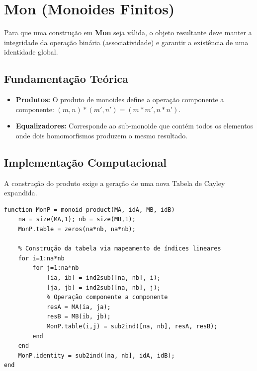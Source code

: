 \section{Mon (Monoides Finitos)}

Para que uma construção em \textbf{Mon} seja válida, o objeto resultante deve manter a integridade da operação binária (associatividade) e garantir a existência de uma identidade global.

\subsection{Fundamentação Teórica}
\begin{itemize}
    \item \textbf{Produtos:} O produto de monoides define a operação componente a componente: $(m,n) * (m',n') = (m * m', n * n')$.
    \item \textbf{Equalizadores:} Corresponde ao sub-monoide que contém todos os elementos onde dois homomorfismos produzem o mesmo resultado.
\end{itemize}

\subsection{Implementação Computacional}
A construção do produto exige a geração de uma nova Tabela de Cayley expandida.

\begin{lstlisting}[caption={Criação da Tabela de Cayley para Produto de Monoides}]
function MonP = monoid_product(MA, idA, MB, idB)
    na = size(MA,1); nb = size(MB,1);
    MonP.table = zeros(na*nb, na*nb);
    
    % Construção da tabela via mapeamento de índices lineares
    for i=1:na*nb
        for j=1:na*nb
            [ia, ib] = ind2sub([na, nb], i);
            [ja, jb] = ind2sub([na, nb], j);
            % Operação componente a componente
            resA = MA(ia, ja);
            resB = MB(ib, jb);
            MonP.table(i,j) = sub2ind([na, nb], resA, resB);
        end
    end
    MonP.identity = sub2ind([na, nb], idA, idB);
end
\end{lstlisting}